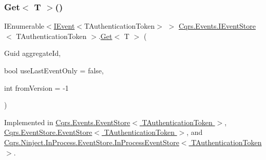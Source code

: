 \mbox{\label{interfaceCqrs_1_1Events_1_1IEventStore_add6227e2978ff8656aad79b1a51bf34c_add6227e2978ff8656aad79b1a51bf34c}} 
\subsubsection{\texorpdfstring{Get$<$ T $>$()}{Get< T >()}}
{\footnotesize\ttfamily I\+Enumerable$<$\hyperlink{interfaceCqrs_1_1Events_1_1IEvent}{I\+Event}$<$T\+Authentication\+Token$>$ $>$ \hyperlink{interfaceCqrs_1_1Events_1_1IEventStore}{Cqrs.\+Events.\+I\+Event\+Store}$<$ T\+Authentication\+Token $>$.\hyperlink{interfaceCqrs_1_1Events_1_1IEventStore_ae02ef6c804d0c4a92705a447bc4b2214_ae02ef6c804d0c4a92705a447bc4b2214}{Get}$<$ T $>$ (\begin{DoxyParamCaption}\item[{Guid}]{aggregate\+Id,  }\item[{bool}]{use\+Last\+Event\+Only = {\ttfamily false},  }\item[{int}]{from\+Version = {\ttfamily -\/1} }\end{DoxyParamCaption})}



Implemented in \hyperlink{classCqrs_1_1Events_1_1EventStore_aa6ffed5d7dd365600669149da29f9e89_aa6ffed5d7dd365600669149da29f9e89}{Cqrs.\+Events.\+Event\+Store$<$ T\+Authentication\+Token $>$}, \hyperlink{classCqrs_1_1EventStore_1_1EventStore_aaa4ebd61c84124425380ce31e3a67600_aaa4ebd61c84124425380ce31e3a67600}{Cqrs.\+Event\+Store.\+Event\+Store$<$ T\+Authentication\+Token $>$}, and \hyperlink{classCqrs_1_1Ninject_1_1InProcess_1_1EventStore_1_1InProcessEventStore_a154f3f96109d63a3bf442a72c1bb0525_a154f3f96109d63a3bf442a72c1bb0525}{Cqrs.\+Ninject.\+In\+Process.\+Event\+Store.\+In\+Process\+Event\+Store$<$ T\+Authentication\+Token $>$}.

\mbox{\label{interfaceCqrs_1_1Events_1_1IEventStore_a81fb586703e7c6dea6b23d9a95f3887a_a81fb586703e7c6dea6b23d9a95f3887a}} 
